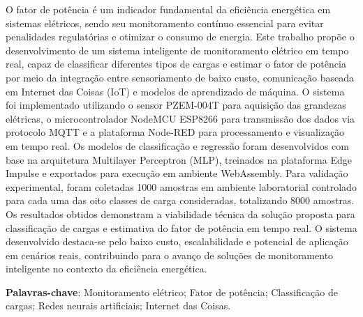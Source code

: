 \setlength{\absparsep}{18pt} 

\begin{resumo}
O fator de potência é um indicador fundamental da eficiência energética em sistemas elétricos, sendo seu monitoramento contínuo essencial para evitar penalidades regulatórias e otimizar o consumo de energia. Este trabalho propõe o desenvolvimento de um sistema inteligente de monitoramento elétrico em tempo real, capaz de classificar diferentes tipos de cargas e estimar o fator de potência por meio da integração entre sensoriamento de baixo custo, comunicação baseada em Internet das Coisas (IoT) e modelos de aprendizado de máquina. O sistema foi implementado utilizando o sensor PZEM-004T para aquisição das grandezas elétricas, o microcontrolador NodeMCU ESP8266 para transmissão dos dados via protocolo MQTT e a plataforma Node-RED para processamento e visualização em tempo real. Os modelos de classificação e regressão foram desenvolvidos com base na arquitetura Multilayer Perceptron (MLP), treinados na plataforma Edge Impulse e exportados para execução em ambiente WebAssembly. Para validação experimental, foram coletadas 1000 amostras em ambiente laboratorial controlado para cada uma das oito classes de carga consideradas, totalizando 8000 amostras. Os resultados obtidos demonstram a viabilidade técnica da solução proposta para classificação de cargas e estimativa do fator de potência em tempo real. O sistema desenvolvido destaca-se pelo baixo custo, escalabilidade e potencial de aplicação em cenários reais, contribuindo para o avanço de soluções de monitoramento inteligente no contexto da eficiência energética.

\textbf{Palavras-chave}: Monitoramento elétrico; Fator de potência; Classificação de cargas; Redes neurais artificiais; Internet das Coisas.

\end{resumo}



